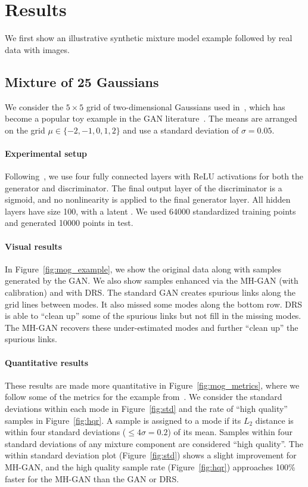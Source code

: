 \documentclass{article}
\renewcommand{\vec}[1]{{\boldsymbol{\mathbf{#1}}}} %
\newcommand{\R}{\mathbb{R}}
\begin{document}




\section{Results}
\label{sec:Results}

We first show an illustrative synthetic mixture model example followed by real data with images.

\subsection{Mixture of 25 Gaussians}

We consider the $5 \times 5$ grid of two-dimensional Gaussians used in~\citet{Azadi2018}, which has become a popular toy example in the GAN literature~\citep{Dumoulin2016}.
The means are arranged on the grid $\mu \in \{{-2},{-1},0,1,2\}$ and use a standard deviation of $\sigma = 0.05$.

\paragraph{Experimental setup}
Following~\citet{Azadi2018}, we use four fully connected layers with ReLU activations for both the generator and discriminator.
The final output layer of the discriminator is a sigmoid, and no nonlinearity is applied to the final generator layer.
All hidden layers have size 100, with a latent \smash{$\vec z \in \R^2$}.
We used \num{64000} standardized training points and generated \num{10000} points in test.

\paragraph{Visual results}
In Figure~\ref{fig:mog_example}, we show the original data along with samples generated by the GAN\@.
We also show samples enhanced via the MH-GAN (with calibration) and with DRS\@.
The standard GAN creates spurious links along the grid lines between modes.
It also missed some modes along the bottom row.
DRS is able to ``clean up'' some of the spurious links but not fill in the missing modes.
The MH-GAN recovers these under-estimated modes and further ``clean up'' the spurious links.

\paragraph{Quantitative results}
These results are made more quantitative in Figure~\ref{fig:mog_metrics}, where we follow some of the metrics for the example from~\citet{Azadi2018}.
We consider the standard deviations within each mode in Figure~\ref{fig:std} and the rate of ``high quality'' samples in Figure~\ref{fig:hqr}.
A sample is assigned to a mode if its $L_2$ distance is within four standard deviations ($\leq 4 \sigma = 0.2$) of its mean.
Samples within four standard deviations of any mixture component are considered ``high quality''.
The within standard deviation plot (Figure~\ref{fig:std}) shows a slight improvement for MH-GAN, and the high quality sample rate (Figure~\ref{fig:hqr}) approaches 100\% faster for the MH-GAN than the GAN or DRS\@.
\end{document}
